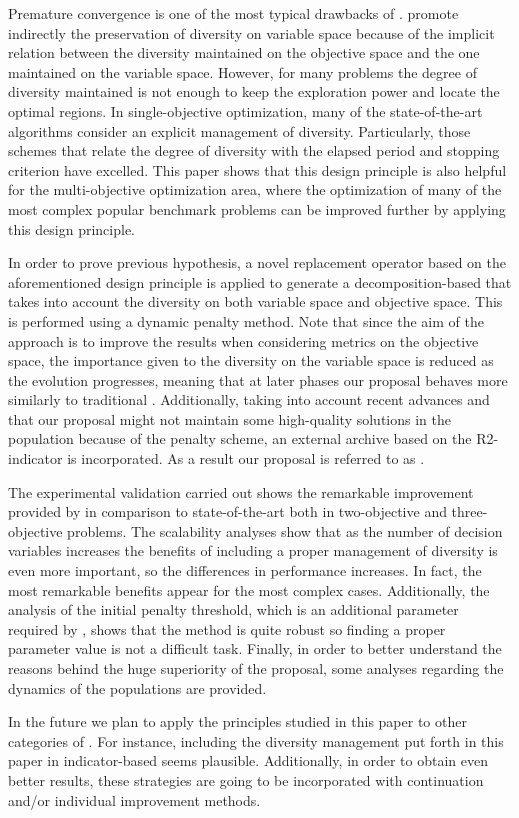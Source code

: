Premature convergence is one of the most typical drawbacks of \EAS{}.
%
\MOEAS{} promote indirectly the preservation of diversity on variable space
because of the implicit relation between the diversity maintained on the objective space and the
one maintained on the variable space.
%
However, for many problems the degree of diversity maintained is not enough to keep the exploration
power and locate the optimal regions.
%
In single-objective optimization, many of the state-of-the-art algorithms consider an explicit management of
diversity.
%
Particularly, those schemes that relate the degree of diversity with the elapsed period and stopping criterion
have excelled.
%
This paper shows that this design principle is also helpful for the multi-objective optimization area,
where the optimization of many of the most complex popular benchmark problems can be improved further
by applying this design principle.

In order to prove previous hypothesis, a novel replacement operator based on the aforementioned design principle
is applied to generate a decomposition-based \MOEA{} that takes into account the diversity on both variable 
space and objective space.
%
This is performed using a dynamic penalty method. 
%
Note that since the aim of the approach is to improve the results when considering metrics on the objective space,
the importance given to the diversity on the variable space is reduced as the evolution progresses, meaning that
at later phases our proposal behaves more similarly to traditional \MOEAS{}.
%
Additionally, taking into account recent advances and that our proposal might not maintain
some high-quality solutions in the population because of the penalty scheme, an external archive based on the
R2-indicator is incorporated.
%
As a result our proposal is referred to as \AVSDMOEAD{}.
%

The experimental validation carried out shows the remarkable improvement provided by \AVSDMOEAD{} in comparison to
state-of-the-art \MOEAS{} both in two-objective and three-objective problems.
%
The scalability analyses show that as the number of decision variables increases the benefits of including
a proper management of diversity is even more important, so the differences in performance increases.
%
In fact, the most remarkable benefits appear for the most complex cases.
%
Additionally, the analysis of the initial penalty threshold, which is an additional parameter required by \AVSDMOEAD{}, 
shows that the method is quite robust so finding a proper parameter value is not a difficult task.
%
Finally, in order to better understand the reasons behind the huge superiority of the proposal, some analyses regarding
the dynamics of the populations are provided.

In the future we plan to apply the principles studied in this paper to other categories of \MOEAS{}.
%
For instance, including the diversity management put forth in this paper in indicator-based \MOEAS{} seems plausible.
%
Additionally, in order to obtain even better results, these strategies are going to be incorporated with continuation and/or individual
improvement methods.
